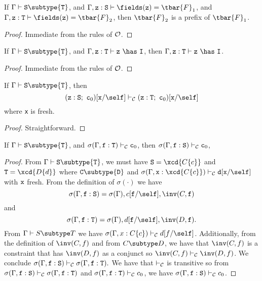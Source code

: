 \begin{lemma}
\label{fields-lemma} %
If   $\Gamma \vdash {\tt S} \subtype {\tt T}$,
and  $\Gamma, {\tt z}: {\tt S} \vdash \fields({\tt z}) = \tbar{F}_1$,
and  $\Gamma, {\tt z}: {\tt T} \vdash \fields({\tt z}) = \tbar{F}_2$,
then $\tbar{F}_2$ is a prefix of $\tbar{F}_1$.
\end{lemma}

\begin{proof}
Immediate from the rules of $\cal O$.
\end{proof}

\begin{lemma}
\label{has-lemma} %
If   $\Gamma \vdash {\tt S} \subtype {\tt T}$,
and  $\Gamma, {\tt z}: {\tt T} \vdash {\tt z}\ \has\ {\tt I}$,
then $\Gamma, {\tt z}: {\tt T} \vdash {\tt z}\ \has\ {\tt I}$.
\end{lemma}

\begin{proof}
Immediate from the rules of $\cal O$.
\end{proof}

\begin{lemma}
\label{existential-subtyping}
If   $\Gamma \vdash {\tt S} \subtype {\tt T}$,
then $$({\tt z}:{\tt S};~{\tt c}_0)[{\tt x}/\self] \vdash_{\cal C} ({\tt z}:{\tt T};~{\tt c}_0)[{\tt x}/\self]$$
where {\tt x} is fresh.
\end{lemma}

\begin{proof}
Straightforward.
\end{proof}

\begin{lemma}
\label{constraint-lemma} %
If   $\Gamma \vdash {\tt S} \subtype {\tt T}$,
and  $\sigma(\Gamma,{\tt f}: {\tt T}) \vdash_{\cal C} {\tt c}_0$,
then $\sigma(\Gamma,{\tt f}: {\tt S}) \vdash_{\cal C} {\tt c}_0$,
\end{lemma}

\begin{proof}
From   $\Gamma \vdash {\tt S} \subtype {\tt T}$,
we must have ${\tt S} = \xcd{C\{c\}}$ and ${\tt T} = \xcd{D\{d\}}$
where
${\tt C} \subtype {\tt D}$
and
$\sigma(\Gamma, {\tt x}: \xcd{C\{c\}}) \vdash_{\cal C} {\tt d}[{\tt x}/\self]$
with ${\tt x}$ fresh.
From the definition of $\sigma(\cdot)$ we have
    $$\sigma(\Gamma,{\tt f}: {\tt S}) =
      \sigma(\Gamma), c[{\tt f}/\self], \inv(C,{\tt f})$$ and
    $$\sigma(\Gamma,{\tt f}: {\tt T}) =
      \sigma(\Gamma), d[{\tt f}/\self], \inv(D,{\tt f}).$$
From $\Gamma \vdash S \subtype T$ we have 
$\sigma(\Gamma, x: C\{c\}) \vdash_{\cal C} d[f/\self]$.
Additionally, from the definition of $\inv(C,f)$ and
from $C \subtype D$, 
we have that $\inv(C,f)$ is a constraint that has $\inv(D,f)$ as a conjunct so 
$\inv(C,f) \vdash_{\cal C} \inv(D,f)$.
We conclude
$\sigma(\Gamma,{\tt f}: {\tt S}) \vdash_{\cal C}
\sigma(\Gamma,{\tt f}: {\tt T}).$
We have that $\vdash_{\cal C}$ is transitive so 
from $\sigma(\Gamma,{\tt f}: {\tt S}) \vdash_{\cal C}
\sigma(\Gamma,{\tt f}: {\tt T})$
and
$\sigma(\Gamma,{\tt f}: {\tt T}) \vdash_{\cal C} c_0$,
we have 
$\sigma(\Gamma,{\tt f}: {\tt S}) \vdash_{\cal C} c_0$.
\end{proof}

